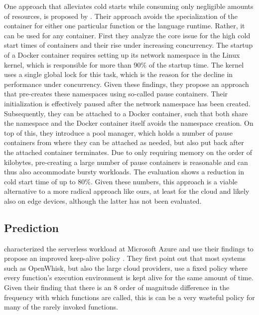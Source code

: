 One approach that alleviates cold starts while consuming only negligible amounts of resources, is proposed by \citeauthor{Mohan2019} \cite{Mohan2019}. Their approach avoids the specialization of the container for either one particular function or the language runtime. Rather, it can be used for any container. First they analyze the core issue for the high cold start times of containers and their rise under increasing concurrency. The startup of a Docker container requires setting up its network namespace in the Linux kernel, which is responsible for more than 90\% of the startup time. The kernel uses a single global lock for this task, which is the reason for the decline in performance under concurrency. Given these findings, they propose an approach that pre-creates these namespaces using so-called pause containers. Their initialization is effectively paused after the network namespace has been created. Subsequently, they can be attached to a Docker container, such that both share the namespace and the Docker container itself avoids the namespace creation. On top of this, they introduce a pool manager, which holds a number of pause containers from where they can be attached as needed, but also put back after the attached container terminates. Due to only requiring memory on the order of kilobytes, pre-creating a large number of pause containers is reasonable and can thus also accommodate bursty workloads. The evaluation shows a reduction in cold start time of up to 80\%. Given these numbers, this approach is a viable alternative to a more radical approach like ours, at least for the cloud and likely also on edge devices, although the latter has not been evaluated.



\subsection{Prediction}

\citeauthor{Shahrad2020} characterized the serverless workload at Microsoft Azure and use their findings to propose an improved keep-alive policy \cite{Shahrad2020}. They first point out that most systems such as OpenWhisk, but also the large cloud providers, use a fixed policy where every function's execution environment is kept alive for the same amount of time. Given their finding that there is an 8 order of magnitude difference in the frequency with which functions are called, this is can be a very wasteful policy for many of the rarely invoked functions.

